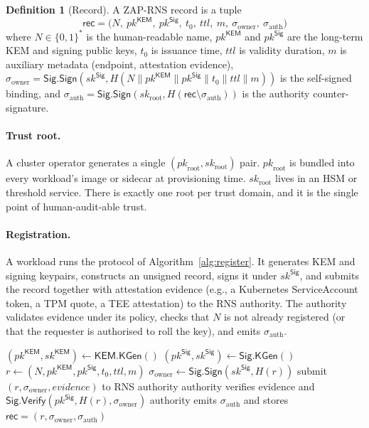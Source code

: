 \documentclass[11pt,a4paper]{article}
\theoremstyle{definition}
\newtheorem{definition}{Definition}
\theoremstyle{remark}
\newcommand{\rec}{\mathsf{rec}}
\newcommand{\KEM}{\mathsf{KEM}}
\newcommand{\Sig}{\mathsf{Sig}}
\newcommand{\KGen}{\mathsf{KGen}}
\newcommand{\Sign}{\mathsf{Sign}}
\newcommand{\Verify}{\mathsf{Verify}}
\newcommand{\pk}{\mathit{pk}}
\newcommand{\sk}{\mathit{sk}}
\newcommand{\RNS}{\textsc{ZAP-RNS}}
\begin{document}
\begin{definition}[Record]\label{def:record}
A \RNS{} record is a tuple
\[
\rec = \bigl(N,\ \pk^\KEM,\ \pk^\Sig,\ t_0,\ \mathit{ttl},\ m,\ \sigma_{\mathrm{owner}},\ \sigma_{\mathrm{auth}}\bigr)
\]
where $N \in \{0,1\}^*$ is the human-readable name, $\pk^\KEM$ and
$\pk^\Sig$ are the long-term KEM and signing public keys, $t_0$ is
issuance time, $\mathit{ttl}$ is validity duration, $m$ is auxiliary
metadata (endpoint, attestation evidence), $\sigma_{\mathrm{owner}} =
\Sig.\Sign(\sk^\Sig, H(N \| \pk^\KEM \| \pk^\Sig \| t_0 \| \mathit{ttl}
\| m))$ is the self-signed binding, and $\sigma_{\mathrm{auth}} =
\Sig.\Sign(\sk_{\mathrm{root}}, H(\rec \setminus \sigma_{\mathrm{auth}}))$
is the authority counter-signature.
\end{definition}

\paragraph{Trust root.} A cluster operator generates a single
$(\pk_{\mathrm{root}}, \sk_{\mathrm{root}})$ pair. $\pk_{\mathrm{root}}$
is bundled into every workload's image or sidecar at provisioning time.
$\sk_{\mathrm{root}}$ lives in an HSM or threshold service. There is
exactly one root per trust domain, and it is the single point of
human-audit-able trust.

\paragraph{Registration.} A workload runs the protocol of
Algorithm~\ref{alg:register}. It generates KEM and signing keypairs,
constructs an unsigned record, signs it under $\sk^\Sig$, and submits
the record together with attestation evidence (e.g., a Kubernetes
ServiceAccount token, a TPM quote, a TEE attestation) to the RNS
authority. The authority validates evidence under its policy, checks
that $N$ is not already registered (or that the requester is authorised
to roll the key), and emits $\sigma_{\mathrm{auth}}$.

\begin{algorithm}
\caption{Registration}\label{alg:register}
\begin{algorithmic}[1]
\State $(\pk^\KEM, \sk^\KEM) \gets \KEM.\KGen()$
\State $(\pk^\Sig, \sk^\Sig) \gets \Sig.\KGen()$
\State $r \gets (N, \pk^\KEM, \pk^\Sig, t_0, \mathit{ttl}, m)$
\State $\sigma_{\mathrm{owner}} \gets \Sig.\Sign(\sk^\Sig, H(r))$
\State submit $(r, \sigma_{\mathrm{owner}}, \mathit{evidence})$ to RNS authority
\State authority verifies evidence and $\Sig.\Verify(\pk^\Sig, H(r), \sigma_{\mathrm{owner}})$
\State authority emits $\sigma_{\mathrm{auth}}$ and stores
$\rec = (r, \sigma_{\mathrm{owner}}, \sigma_{\mathrm{auth}})$
\end{algorithmic}
\end{algorithm}
\end{document}
